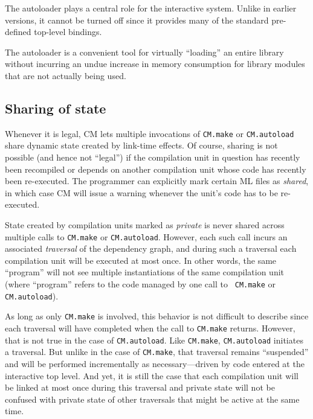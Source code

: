 \documentclass{article}
\begin{document}
The autoloader plays a central role for the interactive system.
Unlike in earlier versions, it cannot be turned off since it provides
many of the standard pre-defined top-level bindings.

The autoloader is a convenient tool for virtually ``loading'' an
entire library without incurring an undue increase in memory
consumption for library modules that are not actually being used.

\subsection{Sharing of state}
\label{sec:sharing}

Whenever it is legal, CM lets multiple invocations of {\tt CM.make} or
{\tt CM.autoload} share dynamic state created by link-time effects.
Of course, sharing is not possible (and hence not ``legal'') if the
compilation unit in question has recently been recompiled or depends
on another compilation unit whose code has recently been re-executed.
The programmer can explicitly mark certain ML files as {\em shared},
in which case CM will issue a warning whenever the unit's code has to
be re-executed.

State created by compilation units marked as {\em private} is never
shared across multiple calls to {\tt CM.make} or {\tt CM.autoload}.
However, each such call incurs an associated {\em traversal} of the
dependency graph, and during such a traversal each compilation unit
will be executed at most once.  In other words, the same ``program''
will not see multiple instantiations of the same compilation unit
(where ``program'' refers to the code managed by one call to {\tt
CM.make} or {\tt CM.autoload}).

As long as only {\tt CM.make} is involved, this behavior is not
difficult to describe since each traversal will have completed when
the call to {\tt CM.make} returns.  However, that is not true in the
case of {\tt CM.autoload}.  Like {\tt CM.make}, {\tt CM.autoload}
initiates a traversal. But unlike in the case of {\tt CM.make}, that
traversal remains ``suspended'' and will be performed incrementally as
necessary---driven by code entered at the interactive top level.  And
yet, it is still the case that each compilation unit will be linked at
most once during this traversal and private state will not be confused
with private state of other traversals that might be active at the
same time.

\end{document}
